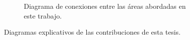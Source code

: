 \begin{figure}[h]
\begin{subfigure}[b]{0.45\linewidth}
        \caption{Diagrama de conexiones entre las áreas abordadas en este trabajo.}
        \label{fig:conexiones}
    \end{subfigure}
    \caption{Diagramas explicativos de las contribuciones de esta tesis.}
\end{figure}
